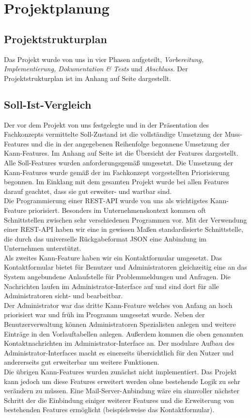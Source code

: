 

\section{Projektplanung}

\subsection{Projektstrukturplan}
Das Projekt wurde von uns in vier Phasen aufgeteilt, \textit{Vorbereitung, Implementierung, Dokumentation \& Tests} und \textit{Abschluss.}
Der Projektstrukturplan ist im Anhang auf Seite \pageref{PSP} dargestellt.

\subsection{Soll-Ist-Vergleich}
Der vor dem Projekt von uns festgelegte und in der Präsentation des Fachkonzepts vermittelte Soll-Zustand ist die vollständige Umsetzung der Muss-Features und die in der angegebenen Reihenfolge begonnene Umsetzung der Kann-Features.
Im Anhang auf Seite \pageref{PM_SOLLIST} ist die Übersicht der Features dargestellt. Alle Soll-Features wurden anforderungsgemäß umgesetzt. Die Umsetzung der Kann-Features wurde gemäß der im Fachkonzept vorgestellten Priorisierung begonnen. Im Einklang mit dem gesamten Projekt wurde bei allen Features darauf geachtet, dass sie gut erweiter- und wartbar sind.\\
Die Programmierung einer REST-API wurde von uns als wichtigstes Kann-Feature priorisiert. Besonders im Unternehmenskontext kommen oft Schnittstellen zwischen sehr verschiedenen Programmen vor. Mit der Verwendung einer REST-API haben wir eine in gewissen Maßen standardisierte Schnittstelle, die durch das universelle Rückgabeformat JSON eine Anbindung im Unternehmen unterstützt. \\
Als zweites Kann-Feature haben wir ein Kontaktformular umgesetzt. Das Kontaktformular bietet für Benutzer und Administratoren gleichzeitig eine an das System angebundene Anlaufstelle für Problemmeldungen und Anfragen. Die Nachrichten laufen im Administrator-Interface auf und sind dort für alle Administratoren sicht- und bearbeitbar.\\
Der Administrator war das dritte Kann-Feature welches von Anfang an hoch priorisiert war und früh im Programm umgesetzt wurde. Neben der Benutzerverwaltung können Administratoren Spezialisten anlegen und weitere Einträge in den Vorlauftabellen anlegen. Außerdem kommen die oben genannten Kontaktnachrichten im Administrator-Interface an. Der modulare Aufbau des Administrator-Interfaces macht es einerseits übersichtlich für den Nutzer und andererseits gut erweiterbar um weitere Funktionen.\\
Die übrigen Kann-Features wurden zunächst nicht implementiert. Das Projekt kann jedoch um diese Features erweitert werden ohne bestehende Logik zu sehr verändern zu müssen. Eine Mail-Server-Anbindung wäre ein sinnvoller nächster Schritt der die Einbindung einiger weiterer Features und die Erweiterung von bestehenden Features ermöglicht (beispielsweise das Kontaktformular).

